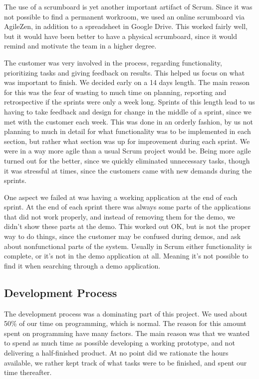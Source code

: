 The use of a scrumboard is yet another important artifact of Scrum. Since it was not possible to find a permanent workroom, we used an online scrumboard via AgileZen, in addition to a spreadsheet in Google Drive. This worked fairly well, but it would have been better to have a physical scrumboard, since it would remind and motivate the team in a higher degree. 

The customer was very involved in the process, regarding functionality, prioritizing tasks and giving feedback on results. This helped us focus on what was important to finish. We decided early on a 14 days length. The main reason for this was the fear of wasting to much time on planning, reporting and retrospective if the sprints were only a week long. Sprints of this length lead to us having to take feedback and design for change in the middle of a sprint, since we met with the customer each week. This was done in an orderly fashion, by us not planning to much in detail for what functionality was to be implemented in each section, but rather what section was up for improvement during each sprint. We were in a way more agile than a usual Scrum project would be. Being more agile turned out for the better, since we quickly eliminated unnecessary tasks, though it was stressful at times, since the customers came with new demands during the sprints. 

One aspect we failed at was having a working application at the end of each sprint. At the end of each sprint there was always some parts of the applications that did not work properly, and instead of removing them for the demo, we didn't show these parts at the demo. This worked out OK, but is not the proper way to do things, since the customer may be confused during demos, and ask about nonfunctional parts of the system. Usually in Scrum either functionality is complete, or it's not in the demo application at all. Meaning it's not possible to find it when searching through a demo application.

\subsection{Development Process}
The development process was a dominating part of this project. We used about 50\% of our time on programming, which is normal. The reason for this amount spent on programming have many factors. The main reason was that we wanted to spend as much time as possible developing a working prototype, and not delivering a half-finished product. At no point did we rationate the hours available, we rather kept track of what tasks were to be finished, and spent our time thereafter. 

